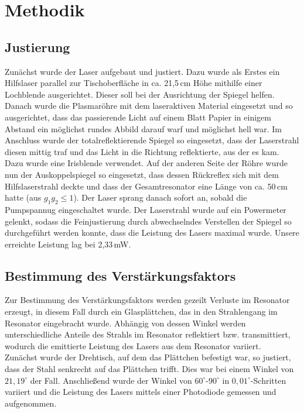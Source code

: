 
\chapter{Methodik}


\section{Justierung}
Zunächst wurde der Laser aufgebaut und justiert. Dazu wurde als Erstes ein Hilfslaser parallel zur Tischoberfläche in ca. 21,5\,cm Höhe mithilfe einer Lochblende ausgerichtet. Dieser soll bei der Ausrichtung der Spiegel helfen. 
Danach wurde die Plasmaröhre mit dem laseraktiven Material eingesetzt und so ausgerichtet, dass das passierende Licht auf einem Blatt Papier in einigem Abstand ein möglichst rundes Abbild darauf warf und möglichst hell war. 
Im Anschluss wurde der totalreflektierende Spiegel so eingesetzt, dass der Laserstrahl diesen mittig traf und das Licht in die Richtung reflektierte, aus der es kam. Dazu wurde eine Irisblende verwendet. 
Auf der anderen Seite der Röhre wurde nun der Auskoppelspiegel so eingesetzt, dass dessen Rückreflex sich mit dem Hilfslaserstrahl deckte und dass der Gesamtresonator eine Länge von ca. 50\,cm hatte (aus $g_1g_2\leq 1$). 
Der Laser sprang danach sofort an, sobald die Pumpspannug eingeschaltet wurde. 
Der Laserstrahl wurde auf ein Powermeter gelenkt, sodass die Feinjustierung durch abwechselndes Verstellen der Spiegel so durchgeführt werden konnte, dass die Leistung des Lasers maximal wurde. Unsere erreichte Leistung lag bei 2,33\,mW. 

\section{Bestimmung des Verstärkungsfaktors}
Zur Bestimmung des Verstärkungsfaktors werden gezeilt Verluste im Resonator erzeugt, in diesem Fall durch ein Glasplättchen, das in den Strahlengang im Resonator eingebracht 
wurde. Abhängig von dessen Winkel werden unterschiedliche Anteile des Strahls im Resonator reflektiert bzw. transmittiert, wodurch die emittierte Leistung des Lasers aus dem 
Resonator variiert. \\
Zunächst wurde der Drehtisch, auf dem das Plättchen befestigt war, so justiert, dass der Stahl senkrecht auf das Plättchen trifft. Dies war bei einem Winkel von $21,19^{\circ}$ der 
Fall. Anschließend wurde der Winkel von $60^{\circ}$-$90^{\circ}$ in $0,01^{\circ}$-Schritten variiert und die Leistung des Lasers mittels einer Photodiode gemessen und aufgenommen.

